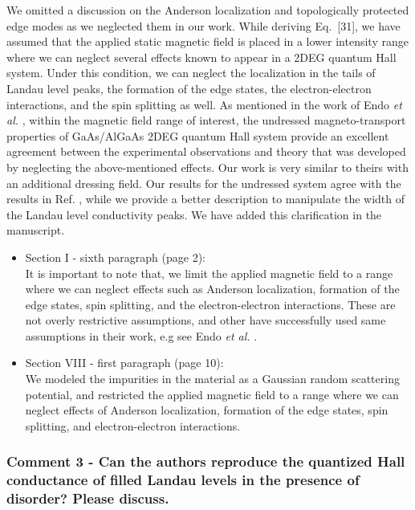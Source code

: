 \documentclass{article}
\begin{document}
We omitted a discussion on the Anderson localization and topologically protected edge modes as we neglected them in our work.
While deriving Eq.~[31], we have assumed that the applied static magnetic field is placed in a lower intensity range where we can neglect several effects known to appear in a 2DEG quantum Hall system. Under this condition, we can neglect the localization in the tails of Landau level peaks, the formation of the edge states, the electron-electron interactions, and the spin splitting as well. As mentioned in the work of Endo \textit{et al.} \cite{endo09}, within the magnetic field range of interest, the undressed
magneto-transport properties of GaAs/AlGaAs 2DEG quantum Hall system provide an excellent agreement between the experimental observations and theory that was developed by neglecting the above-mentioned effects. Our work is very similar to theirs with an additional dressing field. Our results for the undressed system agree with the results in Ref. \cite{endo09}, while we provide a better description to manipulate the width of the Landau level conductivity peaks. We have added this clarification in the manuscript.

\begin{itemize}
  \item Section I - sixth paragraph (page 2):\\
  {\color{Red}
  It is important to note that, we limit the applied magnetic field to a range where we can neglect effects such as Anderson localization, formation of the edge states, spin splitting, and the electron-electron interactions. These are not overly restrictive assumptions, and other have successfully used same assumptions in their work, e.g see Endo \textit{et al.} \cite{endo09}.
  }
  \item Section VIII - first paragraph (page 10):\\
  {\color{Red}
  We modeled the impurities in the material as a Gaussian random scattering potential, and restricted the applied magnetic field to a range where we can neglect effects of Anderson localization, formation of the edge states, spin splitting, and electron-electron interactions.
  }
\end{itemize}


\subsubsection*{Comment 3 -
\color{RoyalBlue} Can the authors reproduce the quantized Hall conductance of filled Landau levels in the presence of disorder? Please discuss.
}
\end{document}
